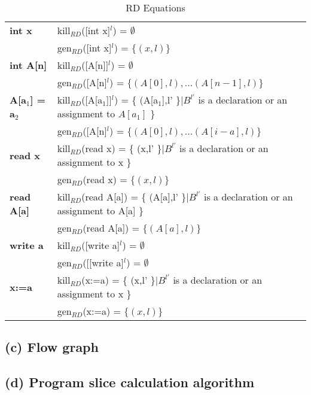 \begin{table}[h]
    \begin{tabular}{l | l }
    \textbf{int x} &  kill$_{RD}$([int x]$^l$) = $\emptyset$ \\
                   &  gen$_{RD}$([int x]$^l$) = $\{(x,l)\}$ \\
    \hline
    \textbf{int A[n]} & kill$_{RD}$([A[n]]$^l$) = $\emptyset$\\
                  & gen$_{RD}$([A[n]$^l$) = $\{(A[0],l), ... (A[n-1],l)\}$ \\

    \hline
    \textbf{A[a$_1$] = a$_2$} & kill$_{RD}$([A[a$_1$]]$^l$) = \{ (A[a$_1$],l' \}|$B^{l'}$ is a declaration or an assignment to $A[a_1]$ \} \\
                              & gen$_{RD}$([A[n]$^l$) = $\{(A[0],l), ... (A[i-a],l)\}$ \\

    \hline
    \textbf{read x} & kill$_{RD}$(read x) = \{ (x,l' \}|$B^{l'}$ is a declaration or an assignment to x \} \\
                              & gen$_{RD}$(read x) = $\{(x,l)\}$ \\
							  
    \hline
    \textbf{read A[a]} & kill$_{RD}$(read A[a]) = \{ (A[a],l' \}|$B^{l'}$ is a declaration or an assignment to A[a] \} \\
                              & gen$_{RD}$(read A[a]) = $\{(A[a],l)\}$ \\
							  
    \hline
    \textbf{write a} &  kill$_{RD}$([write a]$^l$) = $\emptyset$ \\
                   &  gen$_{RD}$([[write a]$^l$) = $\emptyset$ \\

    \hline
    \textbf{x:=a} & kill$_{RD}$(x:=a) = \{ (x,l' \}|$B^{l'}$ is a declaration or an assignment to x \} \\
                              & gen$_{RD}$(x:=a) = $\{(x,l)\}$ \\
    \end{tabular}
    \centering
	\caption{RD Equations}
	\label{table:rd_equations}
\end{table}


\subsection{(c) Flow graph}
\subsection{(d) Program slice calculation algorithm}